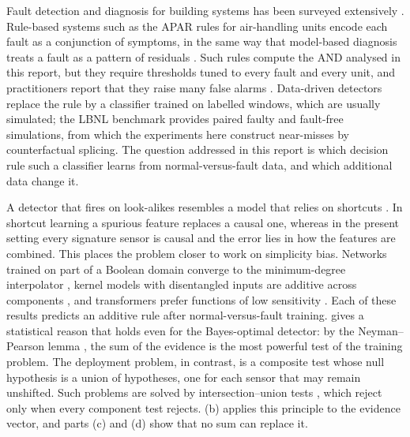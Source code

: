 Fault detection and diagnosis for building systems has been surveyed extensively \citep{katipamula2005a,katipamula2005b,kim2018,zhao2019}. Rule-based systems such as the APAR rules for air-handling units \citep{house2001} encode each fault as a conjunction of symptoms, in the same way that model-based diagnosis treats a fault as a pattern of residuals \citep{gertler1998,venkat2003}. Such rules compute the AND analysed in this report, but they require thresholds tuned to every fault and every unit, and practitioners report that they raise many false alarms \citep{andersen2024}. Data-driven detectors replace the rule by a classifier trained on labelled windows, which are usually simulated; the LBNL benchmark \citep{granderson2023} provides paired faulty and fault-free simulations, from which the experiments here construct near-misses by counterfactual splicing. The question addressed in this report is which decision rule such a classifier learns from normal-versus-fault data, and which additional data change it.

A detector that fires on look-alikes resembles a model that relies on shortcuts \citep{geirhos2020,shah2020,hermann2024}. In shortcut learning a spurious feature replaces a causal one, whereas in the present setting every signature sensor is causal and the error lies in how the features are combined. This places the problem closer to work on simplicity bias. Networks trained on part of a Boolean domain converge to the minimum-degree interpolator \citep{abbe2023}, kernel models with disentangled inputs are additive across components \citep{lippl2025}, and transformers prefer functions of low sensitivity \citep{bhattamishra2023}. Each of these results predicts an additive rule after normal-versus-fault training.  gives a statistical reason that holds even for the Bayes-optimal detector: by the Neyman--Pearson lemma \citep{neyman1933,lehmann2005}, the sum of the evidence is the most powerful test of the training problem. The deployment problem, in contrast, is a composite test whose null hypothesis is a union of hypotheses, one for each sensor that may remain unshifted. Such problems are solved by intersection--union tests \citep{berger1982}, which reject only when every component test rejects. (b) applies this principle to the evidence vector, and parts (c) and (d) show that no sum can replace it.

